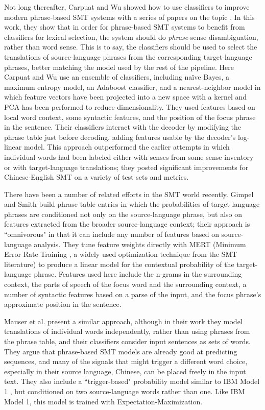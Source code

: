 Not long thereafter, Carpuat and Wu showed how to use classifiers to
improve modern phrase-based SMT systems with a series of papers on the topic
\cite{carpuatpsd,carpuat-wu:2007:EMNLP-CoNLL2007,carpuat2008evaluation,improvingsmtwsd}.
In this work, they show that in order for phrase-based SMT systems to benefit
from classifiers for lexical selection, the system should do
\emph{phrase}-sense disambiguation, rather than word sense. This is to say, the
classifiers should be used to select the translations of source-language
phrases from the corresponding target-language phrases, better matching the
model used by the rest of the pipeline.
Here Carpuat and Wu use an ensemble of classifiers, including naïve Bayes, a
maximum entropy model, an Adaboost classifier, and a nearest-neighbor model in
which feature vectors have been projected into a new space with a kernel and
PCA has been performed to reduce dimensionality.
They used features based on local word context, some syntactic features, and
the position of the focus phrase in the sentence. Their classifiers interact
with the decoder by modifying the phrase table just before decoding, adding
features usable by the decoder's log-linear model.
This approach outperformed the earlier attempts in which individual words had
been labeled either with senses from some sense inventory or with
target-language translations; they posted significant improvements for
Chinese-English SMT on a variety of test sets and metrics.

There have been a number of related efforts in the SMT world recently.
Gimpel and Smith \cite{gimpel-smith:2008:WMT} build phrase table entries in
which the probabilities of target-language phrases are conditioned not only on
the source-language phrase, but also on features extracted from the broader
source-language context; their approach is ``omnivorous" in that it can include
any number of features based on source-language analysis. They tune feature
weights directly with MERT (Minimum Error Rate Training \cite{och:2003:ACL}, a
widely used optimization technique from the SMT literature)
to produce a linear model for the contextual
probability of the target-language phrase. Features used here include the
n-grams in the surrounding context, the parts of speech of the focus word and
the surrounding context, a number of syntactic features based on a parse of
the input, and the focus phrase's approximate position in the sentence.

Mauser et al. \cite{mauser-hasan-ney:2009:EMNLP} present a similar approach,
although in their work they model translations of individual words
independently, rather than using phrases from the phrase table, and their
classifiers consider input sentences as sets of words. They argue that
phrase-based SMT models are already good at predicting sequences, and many of
the signals that might trigger a different word choice, especially in their
source language, Chinese, can be placed freely in the input text. They also
include a ``trigger-based" probability model similar to IBM Model 1
\cite{DBLP:journals/coling/BrownPPM94}, but conditioned on two source-language
words rather than one. Like IBM Model 1, this model is trained with
Expectation-Maximization.

